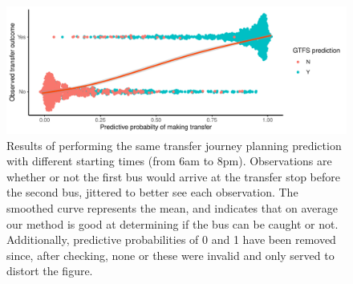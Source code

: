 \begin{knitrout}\small
{}\color{fgcolor}\begin{figure}

{\centering \includegraphics[width=\textwidth]{figure/eta_journey_transfer_many-1} 

}

\caption[Results of performing the same transfer journey planning prediction with different starting times (from 6am to 8pm)]{Results of performing the same transfer journey planning prediction with different starting times (from 6am to 8pm). Observations are whether or not the first bus would arrive at the transfer stop before the second bus, jittered to better see each observation. The smoothed curve represents the mean, and indicates that on average our method is good at determining if the bus can be caught or not. Additionally, predictive probabilities of 0 and 1 have been removed since, after checking, none or these were invalid and only served to distort the figure.}\label{fig:eta_journey_transfer_many}
\end{figure}


\end{knitrout}

